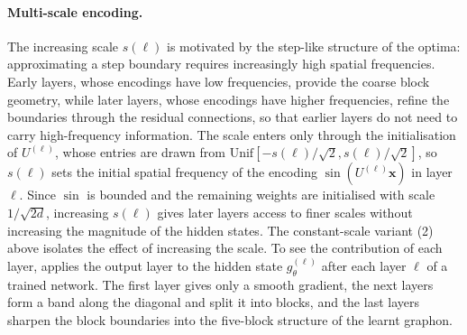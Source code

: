 \documentclass{article}
\theoremstyle{plain}
\theoremstyle{definition}
\theoremstyle{remark}
\begin{document}
\paragraph{Multi-scale encoding.}
The increasing scale $s(\ell)$ is motivated by the step-like structure of the optima: approximating a step boundary requires increasingly high spatial frequencies. Early layers, whose encodings have low frequencies, provide the coarse block geometry, while later layers, whose encodings have higher frequencies, refine the boundaries through the residual connections, so that earlier layers do not need to carry high-frequency information. The scale enters only through the initialisation of $U^{(\ell)}$, whose entries are drawn from $\mathrm{Unif}[-s(\ell)/\sqrt{2}, s(\ell)/\sqrt{2}]$, so $s(\ell)$ sets the initial spatial frequency of the encoding $\sin(U^{(\ell)}\mathbf{x})$ in layer $\ell$. Since $\sin$ is bounded and the remaining weights are initialised with scale $1/\sqrt{2d}$, increasing $s(\ell)$ gives later layers access to finer scales without increasing the magnitude of the hidden states. The constant-scale variant (2) above isolates the effect of increasing the scale. To see the contribution of each layer,  applies the output layer to the hidden state $g^{(\ell)}_\theta$ after each layer $\ell$ of a trained network. The first layer gives only a smooth gradient, the next layers form a band along the diagonal and split it into blocks, and the last layers sharpen the block boundaries into the five-block structure of the learnt graphon.
\end{document}
